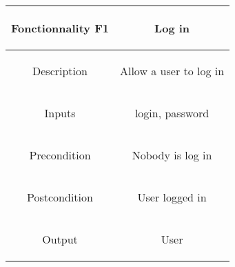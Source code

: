\documentclass{report}
\begin{document}
\begin{center}
	\begin{tabular}{|c|c|}
	\hline
	\begin{bf}Fonctionnality F1\end{bf} & \begin{bf}Log in\end{bf} \\
	\hline
	\begin{bf}Description\end{bf} & \begin{bf}Allow a user to log in\end{bf}  \\
	\hline
	\begin{bf}Inputs\end{bf} & \begin{bf}login, password\end{bf} \\
	\hline
	\begin{bf}Precondition\end{bf} & \begin{bf}Nobody is log in\end{bf}  \\
	\hline
	\begin{bf}Postcondition\end{bf} & \begin{bf}User logged in\end{bf} \\
	\hline
	\begin{bf}Output\end{bf} & \begin{bf}User\end{bf} \\
	\hline
	\end{tabular}
\end{center}
\end{document}
